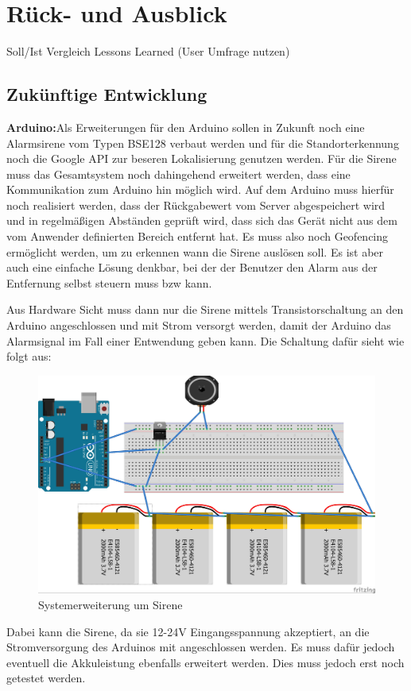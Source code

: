 \section{Rück- und Ausblick}
Soll/Ist Vergleich
Lessons Learned (User Umfrage nutzen)
\subsection{Zukünftige Entwicklung}
\textbf{Arduino:}Als Erweiterungen für den Arduino sollen in Zukunft noch eine Alarmsirene vom Typen BSE128 verbaut werden und für die Standorterkennung noch die Google API zur beseren Lokalisierung genutzen werden. 
Für die Sirene muss das Gesamtsystem noch dahingehend erweitert werden, dass eine Kommunikation zum Arduino hin möglich wird. Auf dem Arduino muss hierfür noch realisiert werden, dass der Rückgabewert vom Server abgespeichert wird und in regelmäßigen Abständen geprüft wird, dass sich das Gerät nicht aus dem vom Anwender definierten Bereich entfernt hat. Es muss also noch Geofencing ermöglicht werden, um zu erkennen wann die Sirene auslösen soll. Es ist aber auch eine einfache Lösung denkbar, bei der der Benutzer den Alarm aus der Entfernung selbst steuern muss bzw kann.

Aus Hardware Sicht muss dann nur die Sirene mittels Transistorschaltung an den Arduino angeschlossen und mit Strom versorgt werden, damit der Arduino das Alarmsignal im Fall einer Entwendung geben kann. Die Schaltung dafür sieht wie folgt aus:
\begin{figure} [H]
	\begin{center}
		\includegraphics[width=1\textwidth]{Bilder/Arduino_Sirene.jpg}
		\caption{Systemerweiterung um Sirene}
		\label{sirene}
	\end{center}
\end{figure}
Dabei kann die Sirene, da sie 12-24V Eingangsspannung akzeptiert, an die Stromversorgung des Arduinos mit angeschlossen werden. Es muss dafür jedoch eventuell die Akkuleistung ebenfalls erweitert werden. Dies muss jedoch erst noch getestet werden. 

